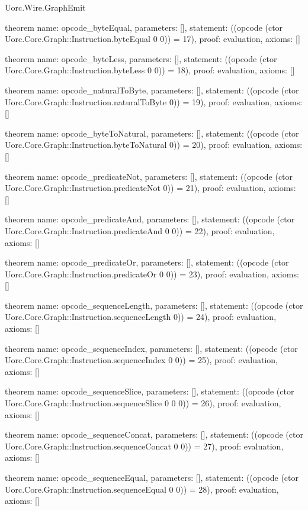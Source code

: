 \begin{lexlean}{Uorc.Wire.GraphEmit}
\begin{semanticmodule}
theorem{
  name: opcode_byteEqual,
  parameters: [],
  statement: ((opcode (ctor Uorc.Core.Graph::Instruction.byteEqual 0 0)) = 17),
  proof: evaluation{},
  axioms: []
}

theorem{
  name: opcode_byteLess,
  parameters: [],
  statement: ((opcode (ctor Uorc.Core.Graph::Instruction.byteLess 0 0)) = 18),
  proof: evaluation{},
  axioms: []
}

theorem{
  name: opcode_naturalToByte,
  parameters: [],
  statement: ((opcode (ctor Uorc.Core.Graph::Instruction.naturalToByte 0)) = 19),
  proof: evaluation{},
  axioms: []
}

theorem{
  name: opcode_byteToNatural,
  parameters: [],
  statement: ((opcode (ctor Uorc.Core.Graph::Instruction.byteToNatural 0)) = 20),
  proof: evaluation{},
  axioms: []
}

theorem{
  name: opcode_predicateNot,
  parameters: [],
  statement: ((opcode (ctor Uorc.Core.Graph::Instruction.predicateNot 0)) = 21),
  proof: evaluation{},
  axioms: []
}

theorem{
  name: opcode_predicateAnd,
  parameters: [],
  statement: ((opcode (ctor Uorc.Core.Graph::Instruction.predicateAnd 0 0)) = 22),
  proof: evaluation{},
  axioms: []
}

theorem{
  name: opcode_predicateOr,
  parameters: [],
  statement: ((opcode (ctor Uorc.Core.Graph::Instruction.predicateOr 0 0)) = 23),
  proof: evaluation{},
  axioms: []
}

theorem{
  name: opcode_sequenceLength,
  parameters: [],
  statement: ((opcode (ctor Uorc.Core.Graph::Instruction.sequenceLength 0)) = 24),
  proof: evaluation{},
  axioms: []
}

theorem{
  name: opcode_sequenceIndex,
  parameters: [],
  statement: ((opcode (ctor Uorc.Core.Graph::Instruction.sequenceIndex 0 0)) = 25),
  proof: evaluation{},
  axioms: []
}

theorem{
  name: opcode_sequenceSlice,
  parameters: [],
  statement: ((opcode (ctor Uorc.Core.Graph::Instruction.sequenceSlice 0 0 0)) = 26),
  proof: evaluation{},
  axioms: []
}

theorem{
  name: opcode_sequenceConcat,
  parameters: [],
  statement: ((opcode (ctor Uorc.Core.Graph::Instruction.sequenceConcat 0 0)) = 27),
  proof: evaluation{},
  axioms: []
}

theorem{
  name: opcode_sequenceEqual,
  parameters: [],
  statement: ((opcode (ctor Uorc.Core.Graph::Instruction.sequenceEqual 0 0)) = 28),
  proof: evaluation{},
  axioms: []
}


\end{semanticmodule}
\end{lexlean}
